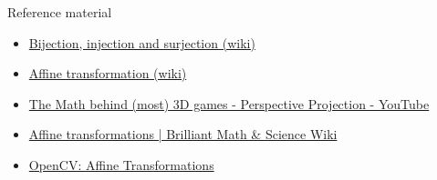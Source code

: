 \documentclass[aspectratio=169]{beamer}
\newcommand{\fbckg}[1]{\usebackgroundtemplate{\texttt{[image: \#1]}}}%
\begin{document}
\begin{frame}[t]{Reference material}
    \begin{itemize}
        \item \href{https://en.wikipedia.org/wiki/Bijection,_injection_and_surjection}{Bijection, injection and surjection (wiki)}
        \item \href{https://en.wikipedia.org/wiki/Affine_transformation}{Affine transformation (wiki)}
        \item \href{https://youtu.be/U0_ONQQ5ZNM?si=C0MmSmUXBKFjsYAT}{The Math behind (most) 3D games - Perspective Projection - YouTube}
        \item \href{https://brilliant.org/wiki/affine-transformations/}{Affine transformations | Brilliant Math \& Science Wiki}
        \item \href{https://docs.opencv.org/3.4/d4/d61/tutorial_warp_affine.html}{OpenCV: Affine Transformations}
    \end{itemize}
\end{frame}

\fbckg{fibeamer/figs/last_page.png}
\frame[plain]{}
\end{document}

